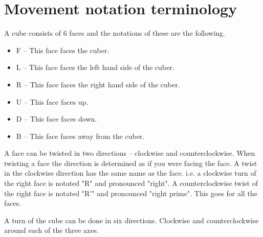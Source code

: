 \section{Movement notation terminology}
A cube consists of 6 faces and the notations of these are the following.
\begin{itemize}
\item {} F -- This face faces the cuber.
\item {} L -- This face faces the left hand side of the cuber.
\item {} R -- This face faces the right hand side of the cuber.
\item {} U -- This face faces up.
\item {} D -- This face faces down.
\item {} B -- This face faces away from the cuber.
\end{itemize} 

A face can be twisted in two directions -- clockwise and counterclockwise. When twisting a face the direction is determined as if you were facing the face.
A twist in the clockwise direction has the same name as the face. i.e. a clockwise turn of the right face is notated "R" and pronounced "right". A counterclockwise twist of the right face is notated "R'" and pronounced "right prime". This goes for all the faces.

A turn of the cube can be done in six directions. Clockwise and counterclockwise around each of the three axes.





